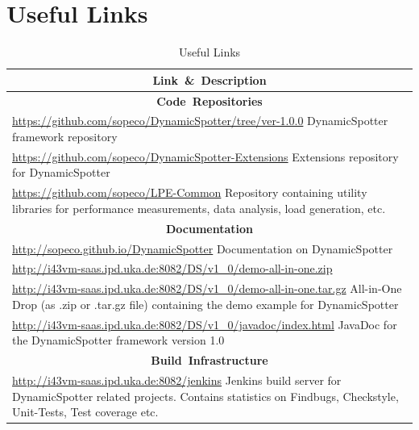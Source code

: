 \documentclass{report}
\newcommand{\DS}{DynamicSpotter }
\newcommand{\link}[1]{\textcolor[rgb]{0.0,0.0,1.0}{\href{#1}{#1}}}
\begin{document}
\newpage
\section{Useful Links}
\label{sec:links}
\begin{table}[h]
\centering
\begin{tabular}{p{}}
\toprule
 \multicolumn{1}{c}{\mbox{\textbf{Link} \& \textbf{Description}}}\\
\midrule
\midrule
\multicolumn{1}{c}{\mbox{\textbf{Code Repositories}}}\\
\midrule
\small{\link{https://github.com/sopeco/DynamicSpotter/tree/ver-1.0.0}}
\newline
\newline 
\DS framework
repository\\
\midrule
\small{\link{https://github.com/sopeco/DynamicSpotter-Extensions}}
\newline
\newline
Extensions repository for \DS\\
\midrule
\small{\link{https://github.com/sopeco/LPE-Common}} 
\newline
\newline
Repository containing
utility libraries for performance measurements, data analysis, load generation, etc.\\
\midrule
\multicolumn{1}{c}{\mbox{\textbf{Documentation}}}\\
\midrule
\small{\link{http://sopeco.github.io/DynamicSpotter}}
\newline
\newline
Documentation on \DS\\
\midrule
\small{\link{http://i43vm-saas.ipd.uka.de:8082/DS/v1\_0/demo-all-in-one.zip}}\\
\small{\link{http://i43vm-saas.ipd.uka.de:8082/DS/v1\_0/demo-all-in-one.tar.gz}}
\newline
\newline
All-in-One Drop (as .zip or .tar.gz file) containing the demo example for \DS\\
\midrule
\small{\link{http://i43vm-saas.ipd.uka.de:8082/DS/v1\_0/javadoc/index.html}}
\newline
\newline 
JavaDoc for the \DS framework version 1.0\\
\midrule
\multicolumn{1}{c}{\mbox{\textbf{Build Infrastructure}}}\\
\midrule
\small{\link{http://i43vm-saas.ipd.uka.de:8082/jenkins}}
\newline
\newline 
Jenkins build server for \DS related projects. Contains statistics on Findbugs, Checkstyle, Unit-Tests, Test
coverage etc.\\
\bottomrule
\end{tabular}
\caption{Useful Links}
\label{tab:usefulLinks}
\end{table}



\end{document}
